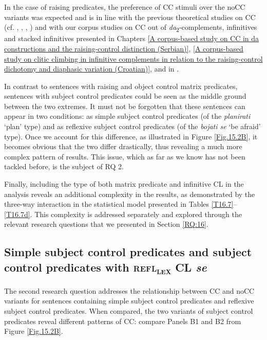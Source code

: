 \noindent In the case of raising predicates, the preference of CC stimuli over the noCC variants was expected and is in line with the previous theoretical studies on CC (cf. \citealt[][]{Aljovic05}, \citealt[][]{Rezac99, Rezac05}, \citealt[][]{Dotlacil04}, \citealt[][]{Hana07}) and with our corpus studies on CC out of \textit{da}\textsubscript{2}-complements, infinitives and stacked infinitives presented in Chapters \ref{A corpus-based study on CC in da constructions and the raising-control distinction (Serbian)}, \ref{A corpus-based study on clitic climbing in infinitive complements in relation to the raising-control dichotomy and diaphasic variation (Croatian)}, and in \citet*{HKJ18}. 

In contrast to sentences with raising and object control matrix predicates, sentences with subject control predicates could be seen as the middle ground between the two extremes. It must not be forgotten that these sentences can appear in two conditions: as simple subject control predicates (of the \textit{planirati} ‘plan’ type) and as reflexive subject control predicates (of the \textit{bojati se} ‘be afraid’ type). Once we account for this difference, as illustrated in Figure \ref{Fig.15.2B}, it becomes obvious that the two differ drastically, thus revealing a much more complex pattern of results. This issue, which as far as we know has not been tackled before, is the subject of RQ 2.

Finally, including the type of both matrix predicate and infinitive CL in the analysis reveals an additional complexity in the results, as demonstrated by the three-way interaction in the statistical model presented in Tables \ref{T16.7}--\ref{T16.7d}. This complexity is addressed separately and explored through the relevant research questions that we presented in Section \ref{RQ:16}.

\subsection[Simple subject control predicates and subject control predicates with \textsc{refl\textsubscript{\textsc{lex}}} CL se]{Simple subject control predicates and subject control predicates with \textsc{refl\textsubscript{\textsc{lex}}} CL \textit{se}}
\label{Simple subject control predicates and subject control predicates with refllex CL se}

The second research question addresses the relationship between CC and noCC variants for sentences containing simple subject control predicates and reflexive subject control predicates. When compared, the two variants of subject control predicates reveal different patterns of CC: compare Panels B1 and B2 from Figure \ref{Fig.15.2B}.

